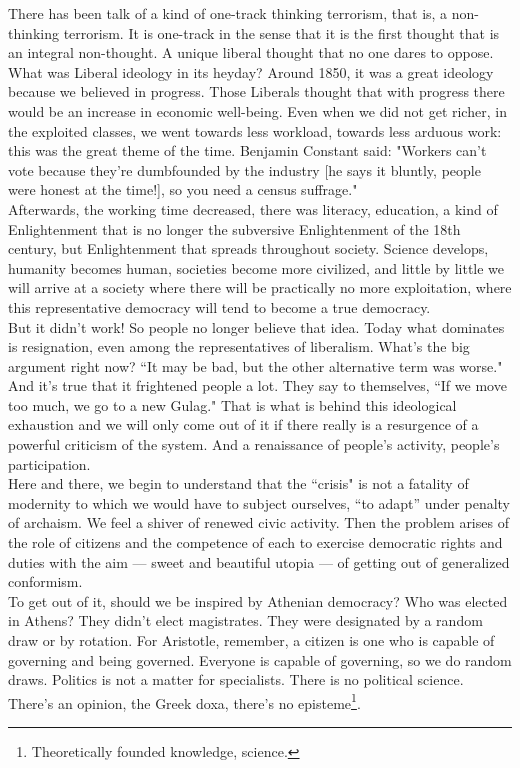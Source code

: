 There has been talk of a kind of one-track thinking terrorism, that is, a non-thinking terrorism. It is one-track in the sense that it is the first thought that is an integral non-thought. A unique liberal thought that no one dares to oppose. What was Liberal ideology in its heyday? Around 1850, it was a great ideology because we believed in progress. Those Liberals thought that with progress there would be an increase in economic well-being. Even when we did not get richer, in the exploited classes, we went towards less workload, towards less arduous work: this was the great theme of the time. Benjamin Constant said: "Workers can't vote because they're dumbfounded by the industry [he says it bluntly, people were honest at the time!], so you need a census suffrage."\\
Afterwards, the working time decreased, there was literacy, education, a kind of Enlightenment that is no longer the subversive Enlightenment of the 18th century, but Enlightenment that spreads throughout society. Science develops, humanity becomes human, societies become more civilized, and little by little we will arrive at a society where there will be practically no more exploitation, where this representative democracy will tend to become a true democracy.\\
But it didn't work! So people no longer believe that idea. Today what dominates is resignation, even among the representatives of liberalism. What's the big argument right now? ``It may be bad, but the other alternative term was worse." And it's true that it frightened people a lot. They say to themselves, ``If we move too much, we go to a new Gulag." That is what is behind this ideological exhaustion and we will only come out of it if there really is a resurgence of a powerful criticism of the system. And a renaissance of people's activity, people's participation.\\
Here and there, we begin to understand that the ``crisis" is not a fatality of modernity to which we would have to subject ourselves, ``to adapt'' under penalty of archaism. We feel a shiver of renewed civic activity. Then the problem arises of the role of citizens and the competence of each to exercise democratic rights and duties with the aim --- sweet and beautiful utopia --- of getting out of generalized conformism.\\
To get out of it, should we be inspired by Athenian democracy? Who was elected in Athens? They didn't elect magistrates. They were designated by a random draw or by rotation. For Aristotle, remember, a citizen is one who is capable of governing and being governed. Everyone is capable of governing, so we do random draws. Politics is not a matter for specialists. There is no political science. There's an opinion, the Greek doxa, there's no episteme\footnote{Theoretically founded knowledge, science.}.\\
